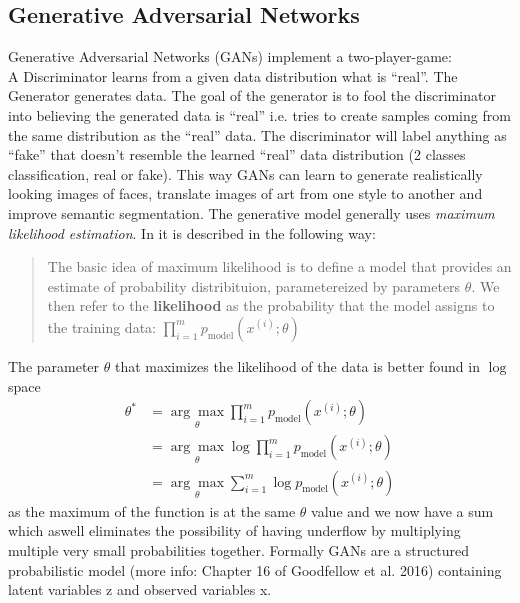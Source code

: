 \subsection{Generative Adversarial Networks}
Generative Adversarial Networks (GANs) implement a two-player-game:\\
A Discriminator learns from a given data distribution what is ``real''. The Generator generates data. The goal of the generator is to fool the discriminator into believing the generated data is ``real'' i.e. tries to create samples coming from the same distribution as the ``real'' data. The discriminator will label anything as ``fake'' that doesn't resemble the learned ``real'' data distribution (2 classes classification, real or fake). This way GANs can learn to generate realistically looking images of faces, translate images of art from one style to another and improve semantic segmentation.
The generative model generally uses \textit{maximum likelihood estimation}. In \cite{DBLP:journals/corr/Goodfellow17} it is described in the following way:
\begin{quote}
	The basic idea of maximum likelihood is to define a model that provides an estimate of probability distribituion, parametereized by parameters $\theta$. We then refer to the \textbf{likelihood} as the probability that the model assigns to the training data: $\prod_{i=1}^{m}p_{\text{model}}(x^{(i)}; \theta)$
\end{quote}
The parameter $\theta$ that maximizes the likelihood of the data is better found in $\log$ space \cite{DBLP:journals/corr/Goodfellow17}
\begin{align}
	\theta^* &= \underset{\theta}{\arg \max} \prod_{i = 1}^{m} p_{\text{model}} (x^{(i)}; \theta)\\
	&= \underset{\theta}{\arg \max} \log \prod_{i=1}^{m} p_{\text{model}}(x^{(i)}; \theta)\\
	&= \underset{\theta}{\arg \max} \sum_{i = 1}^{m} \log p_{\text{model}}(x^{(i)}; \theta)
\end{align}
as the maximum of the function is at the same $\theta$ value and we now have a sum which aswell eliminates the possibility of having underflow by multiplying multiple very small probabilities together.
Formally GANs are a structured probabilistic model (more info: Chapter 16 of Goodfellow et al. 2016) containing latent variables z and observed variables x.
